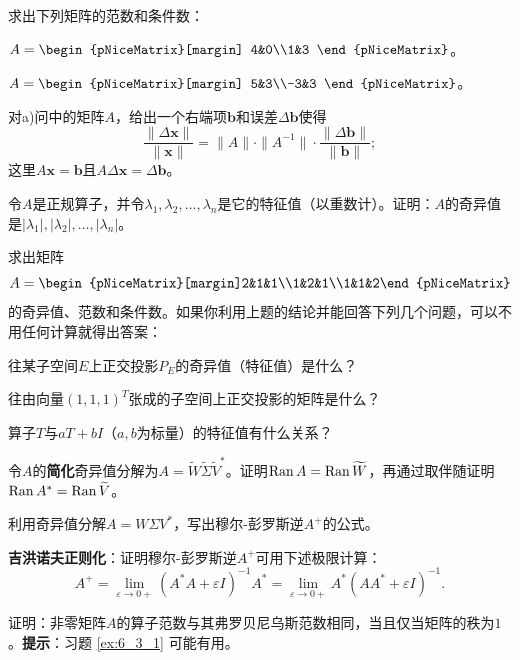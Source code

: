\begin{problemset}
    \item 求出下列矩阵的范数和条件数：
    \begin{probenumerate}
        \item $A=\begin{pNiceMatrix}[margin]
            4&0\\1&3
        \end{pNiceMatrix}$。
        \item $A=\begin{pNiceMatrix}[margin]
            5&3\\-3&3
        \end{pNiceMatrix}$。
    \end{probenumerate}

    对a)问中的矩阵$A$，给出一个右端项$\mathbf{b}$和误差$\Delta\mathbf{b}$使得
    \[\frac{\|\Delta\mathbf{x}\|}{\|\mathbf{x}\|}=\|A\|\cdot\|A^{-1}\|\cdot\frac{\|\Delta\mathbf{b}\|}{\|\mathbf{b}\|};\]
    这里$A\mathbf{x}=\mathbf{b}$且$A\Delta\mathbf{x}=\Delta\mathbf{b}$。
    \item 令$A$是正规算子，并令$\lambda_1,\lambda_2,\ldots,\lambda_n$是它的特征值（以重数计）。证明：$A$的奇异值是$|\lambda_1|,|\lambda_2|,\dots,|\lambda_n|$。
    \item 求出矩阵\[A=\begin{pNiceMatrix}[margin]2&1&1\\1&2&1\\1&1&2\end{pNiceMatrix}\]
    的奇异值、范数和条件数。如果你利用上题的结论并能回答下列几个问题，可以不用任何计算就得出答案：
    \begin{probenumerate}
        \item 往某子空间$E$上正交投影$P_E$的奇异值（特征值）是什么？
        \item 往由向量$(1,1,1)^T$张成的子空间上正交投影的矩阵是什么？
        \item 算子$T$与$aT+bI$（$a,b$为标量）的特征值有什么关系？
    \end{probenumerate}
    \item \label{ex:6_4_4} 令$A$的{\bf 简化}奇异值分解为$A=\widetilde{W}\widetilde{\Sigma}\widetilde{V}^*$。证明$\operatorname{Ran} A=\operatorname{Ran} \widetilde{W}$，再通过取伴随证明$\operatorname{Ran} A^*=\operatorname{Ran} \widetilde{V}$。
    \item 利用奇异值分解$A=W\Sigma V^*$，写出穆尔-彭罗斯逆$A^+$的公式。
    \item {\bf 吉洪诺夫正则化}：证明穆尔-彭罗斯逆$A^+$可用下述极限计算：
    \[A^{+}=\lim_{\varepsilon\to0+}(A^{*}A+\varepsilon I)^{-1}A^{*}=\lim_{\varepsilon\to0+}A^{*}(AA^{*}+\varepsilon I)^{-1}.\]
    \item \label{ex:6_4_7} 证明：非零矩阵$A$的算子范数与其弗罗贝尼乌斯范数相同，当且仅当矩阵的秩为$1$。{\bf 提示}：习题 \ref{ex:6_3_1} 可能有用。
\end{problemset}

